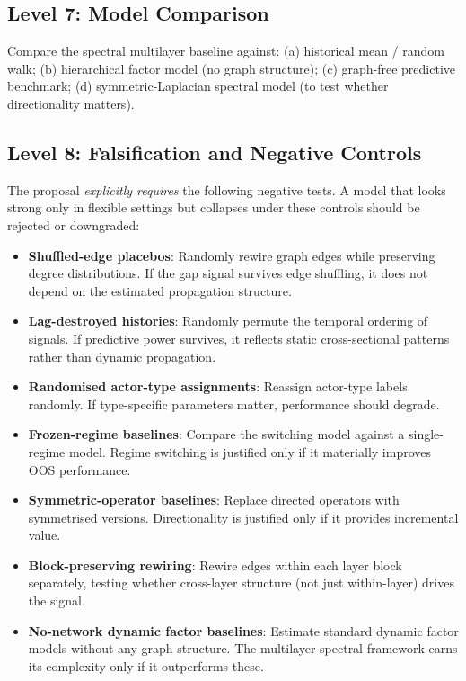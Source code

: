 \documentclass[11pt,a4paper]{article}
\theoremstyle{definition}
\begin{document}
\subsection{Level 7: Model Comparison}
Compare the spectral multilayer baseline against: (a) historical mean / random walk; (b) hierarchical factor model (no graph structure); (c) graph-free predictive benchmark; (d) symmetric-Laplacian spectral model (to test whether directionality matters).

\subsection{Level 8: Falsification and Negative Controls}
\label{sec:falsification}

The proposal \emph{explicitly requires} the following negative tests. A model that looks strong only in flexible settings but collapses under these controls should be rejected or downgraded:
\begin{itemize}[nosep]
  \item \textbf{Shuffled-edge placebos}: Randomly rewire graph edges while preserving degree distributions. If the gap signal survives edge shuffling, it does not depend on the estimated propagation structure.
  \item \textbf{Lag-destroyed histories}: Randomly permute the temporal ordering of signals. If predictive power survives, it reflects static cross-sectional patterns rather than dynamic propagation.
  \item \textbf{Randomised actor-type assignments}: Reassign actor-type labels randomly. If type-specific parameters matter, performance should degrade.
  \item \textbf{Frozen-regime baselines}: Compare the switching model against a single-regime model. Regime switching is justified only if it materially improves OOS performance.
  \item \textbf{Symmetric-operator baselines}: Replace directed operators with symmetrised versions. Directionality is justified only if it provides incremental value.
  \item \textbf{Block-preserving rewiring}: Rewire edges within each layer block separately, testing whether cross-layer structure (not just within-layer) drives the signal.
  \item \textbf{No-network dynamic factor baselines}: Estimate standard dynamic factor models \citep{stock2002macroeconomic,forni2000generalized} without any graph structure. The multilayer spectral framework earns its complexity only if it outperforms these.
\end{itemize}
\end{document}
